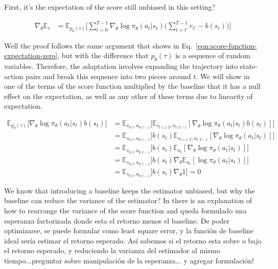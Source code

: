 First, it's the expectation of the score still unbiased in this setting?

\begin{equation}\label{eqn:reinforce-gradient-estimator-baseline}
    \begin{split}
        \nabla_{\theta}\mathbb{E}_{\tau} &= \mathbb{E}_{p_{\theta}(\tau)} \bigg[\sum_{t=0}^{T-1}\nabla_{\theta}\log\pi_{\theta}(a_{t}|s_{t}) \bigg( \sum_{t=t'}^{T-1} r_{t'}-b(s_{t}) \bigg) \bigg]
    \end{split}
\end{equation}

Well the proof follows the same argument that shows in Eq.~\ref{eqn:score-function-expectation-zero}, but with the difference that 
$p_{\theta}(\tau)$ is a sequence of random variables. Therefore,
the adaptation involves expanding the trajectory into state-action pairs and break this sequence into two pieces around $t$. We will show in one of the
terms  of the score function multiplied by the baseline that it has a null
effect on the expectation, as well as any other of these terms due to linearity of expectation.

\begin{equation}\label{eqn:reinforce-baseline-unbiased}
   \begin{split}
        \mathbb{E}_{p_{\theta}(\tau)}\big[\nabla_{\theta}\log\pi_{\theta}(a_t|s_t) b(s_t) \big] &= \mathbb{E}_{s_{0:t}, a_{0:t-1}}\big[\mathbb{E}_{s_{t+1:T}, a_{t:T-1}}[ \nabla_{\theta}\log \pi_{\theta}(a_{t}|s_{t})b(s_{t})]\big] \\
        &= \mathbb{E}_{s_{0:t}, a_{0:t-1}}\big[b(s_{t})\mathbb{E}_{s_{t+1:T}, a_{t:T-1}}[ \nabla_{\theta}\log \pi_{\theta}(a_{t}|s_{t})]\big] \\
        &= \mathbb{E}_{s_{0:t}, a_{0:t-1}}\big[b(s_{t})\mathbb{E}_{a_{t}}[ \nabla_{\theta}\log \pi_{\theta}(a_{t}|s_{t})]\big] \\
        &= \mathbb{E}_{s_{0:t}, a_{0:t-1}}\big[b(s_{t})\nabla_{\theta}\mathbb{E}_{a_{t}}[\log \pi_{\theta}(a_{t}|s_{t})]\big] \\
        &= \mathbb{E}_{s_{0:t}, a_{0:t-1}}\big[b(s_{t})\nabla_{\theta}1\big] = 0
   \end{split}
\end{equation}

We know that introducing a baseline keeps the estimator unbiased, but why
the baseline can reduce the variance of the estimator? In \cite{seita2017going}
there is an explanation of how to rearrange the variance of the score function and queda formulado una esperanza factorizada donde esta el retorno menos el baseline. De poder optimizarse, se puede formular como least square error, y
la función de baseline ideal sería estimar el retorno esperado. Así sabemos
si el retorno esta sobre o bajo el retorno esperado, y reduciendo la varianza 
del estimador al mismo tiempo...preguntar sobre manipulación de la esperanza...
y agregar formulación!


